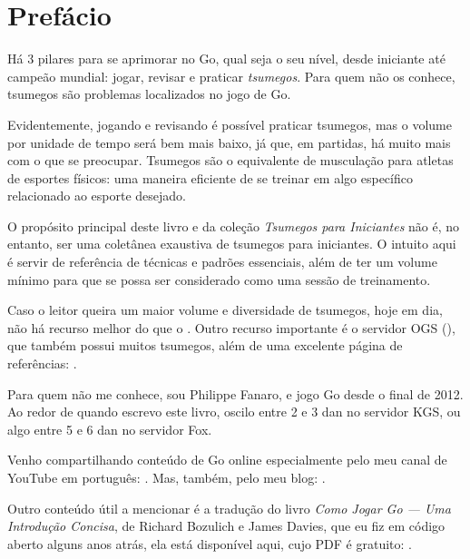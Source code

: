 \chapter{Prefácio}
  
Há 3 pilares para se aprimorar no Go, qual seja o seu nível, desde iniciante até campeão mundial: jogar, revisar e praticar \emph{tsumegos}. Para quem não os conhece, tsumegos são problemas localizados no jogo de Go.

Evidentemente, jogando e revisando é possível praticar tsumegos, mas o volume por unidade de tempo será bem mais baixo, já que, em partidas, há muito mais com o que se preocupar. Tsumegos são o equivalente de musculação para atletas de esportes físicos: uma maneira eficiente de se treinar em algo específico relacionado ao esporte desejado.

O propósito principal deste livro e da coleção \emph{Tsumegos para Iniciantes} não é, no entanto, ser uma coletânea exaustiva de tsumegos para iniciantes. O intuito aqui é servir de referência de técnicas e padrões essenciais, além de ter um volume mínimo para que se possa ser considerado como uma sessão de treinamento. 

Caso o leitor queira um maior volume e diversidade de tsumegos, hoje em dia, não há recurso melhor do que o . Outro recurso importante é o servidor OGS (), que também possui muitos tsumegos, além de uma excelente página de referências: .

\bigskip
\bigskip

Para quem não me conhece, sou Philippe Fanaro, e jogo Go desde o final de 2012. Ao redor de quando escrevo este livro, oscilo entre 2 e 3 dan no servidor KGS, ou algo entre 5 e 6 dan no servidor Fox.

Venho compartilhando conteúdo de Go online especialmente pelo meu canal de YouTube em português: . Mas, também, pelo meu blog: .

Outro conteúdo útil a mencionar é a tradução do livro \emph{Como Jogar Go --- Uma Introdução Concisa}, de Richard Bozulich e James Davies, que eu fiz em código aberto alguns anos atrás, ela está disponível aqui, cujo PDF é gratuito: .

